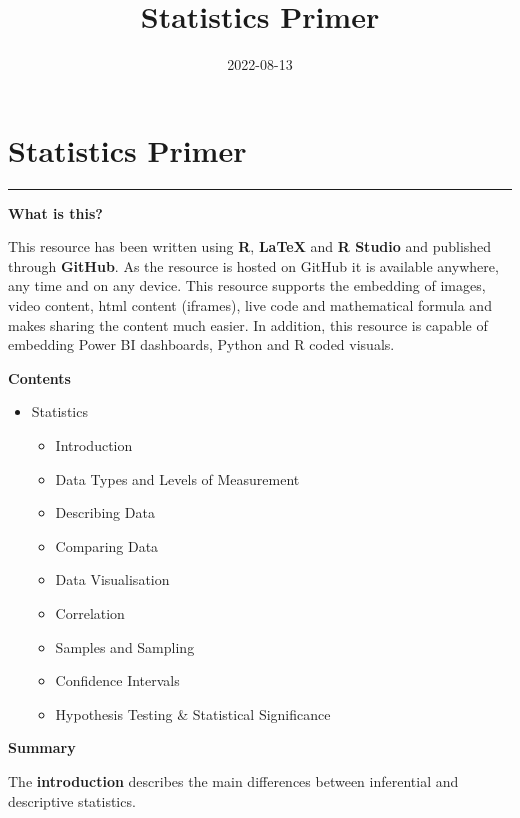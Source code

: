 \documentclass[
]{book}
\title{Statistics Primer}
\author{}
\date{\vspace{-2.5em}2022-08-13}
\providecommand{\tightlist}{%
  \setlength{\itemsep}{0pt}\setlength{\parskip}{0pt}}
\begin{document}
\maketitle

{
\setcounter{tocdepth}{1}
\tableofcontents
}
\hypertarget{Statistics-Primer}{%
\chapter*{Statistics Primer}\label{Statistics-Primer}}

\begin{center}\rule{0.5\linewidth}{0.5pt}\end{center}

\textbf{What is this?}

This resource has been written using \textbf{R}, \textbf{LaTeX} and \textbf{R Studio} and published through \textbf{GitHub}. As the resource is hosted on GitHub it is available anywhere, any time and on any device. This resource supports the embedding of images, video content, html content (iframes), live code and mathematical formula and makes sharing the content much easier. In addition, this resource is capable of embedding Power BI dashboards, Python and R coded visuals.

\textbf{Contents}

\begin{itemize}
\tightlist
\item
  Statistics

  \begin{itemize}
  \tightlist
  \item
    Introduction
  \item
    Data Types and Levels of Measurement
  \item
    Describing Data
  \item
    Comparing Data
  \item
    Data Visualisation
  \item
    Correlation
  \item
    Samples and Sampling
  \item
    Confidence Intervals
  \item
    Hypothesis Testing \& Statistical Significance
  \end{itemize}
\end{itemize}

\textbf{Summary}

The \textbf{introduction} describes the main differences between inferential and descriptive statistics.
\end{document}
